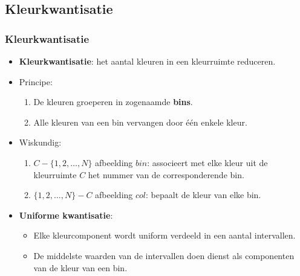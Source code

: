 \documentclass[dutch]{beamer}
\theoremstyle{definition}
\theoremstyle{remark}
\theoremstyle{example}
\begin{document}
\subsection{Kleurkwantisatie}
\frame
{
  \frametitle{Kleurkwantisatie}
  \begin{itemize}
    \item \textbf{Kleurkwantisatie}: het aantal kleuren in een kleurruimte 
    reduceren.
    \item Principe:
    \begin{enumerate}
      \item De kleuren groeperen in zogenaamde \textbf{bins}.
      \item Alle kleuren van een bin vervangen door \'e\'en enkele kleur.
    \end{enumerate}
    \item Wiskundig:
    \begin{enumerate}
    \item $C - \{1,2,\ldots,N\}$ afbeelding $bin$: associeert met elke kleur uit de 
    kleurruimte $C$ het nummer van de corresponderende bin.
    \item $\{1,2,\ldots,N\} - C$ afbeelding $col$: bepaalt de kleur van elke bin.
    \end{enumerate}
    \item \textbf{Uniforme kwantisatie}: 
    \begin{itemize}
      \item Elke kleurcomponent wordt uniform verdeeld in een aantal intervallen. 
      \item De middelste waarden van de intervallen doen dienst
      als componenten van de kleur van een bin.
    \end{itemize}
  \end{itemize}
}
\frame
\end{document}

